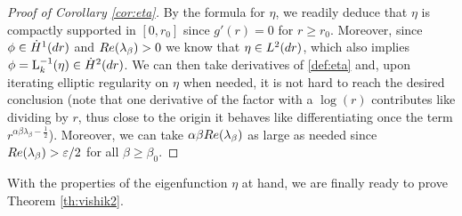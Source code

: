 \documentclass[11pt,reqno]{amsproc}
\def\dd{{\rm d}}
\def\eps{\varepsilon}
\def\Re{{\rm Re}}
\newcommand{\rmL}{\mathrm{L}}
\theoremstyle{definition}
\theoremstyle{definition}
\numberwithin{equation}{section}
\begin{document}
\begin{proof}[Proof of Corollary \ref{cor:eta}]
By the formula for $\eta$, we readily deduce that $\eta$ is compactly supported in $[0,r_0]$ since $g'(r)=0$ for $r\geq r_0$. Moreover, since $\phi \in \dot{H}^1(\dd r)$ and $\Re(\lambda_\beta)>0$ we know that $\eta \in L^2(\dd r)$, which also implies $\phi=\rmL_k^{-1}(\eta) \in \dot{H}^2(\dd r)$. We can then take derivatives of \cref{def:eta} and, upon iterating elliptic regularity on $\eta$ when needed, it is not hard to  reach the desired conclusion (note that one derivative of the factor with a $\log(r)$ contributes like dividing by $r$, thus close to the origin it behaves like differentiating once the term $r^{\alpha\beta\lambda_\beta-\frac12}$). Moreover, we can take $\alpha\beta\Re(\lambda_\beta)$ as large as needed since $\Re(\lambda_\beta)>\eps/2$ for all $\beta\geq \beta_0$.
\end{proof}
With the properties of the eigenfunction $\eta$ at hand, we are finally ready to prove Theorem \ref{th:vishik2}.
\end{document}

